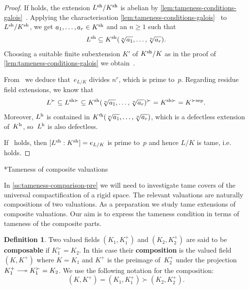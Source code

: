 \documentclass[a4paper,twoside,11pt,reqno]{amsart}
\makeatletter
\DeclareRobustCommand\longtwoheadrightarrow {\relbar\joinrel\twoheadrightarrow}
\newcommand{\surj}{\longtwoheadrightarrow}
\newcommand{\sep}{{\rm sep}} %
\newcommand{\sh}{{\rm sh}}   %
\newcommand{\rh}{{\rm h}}  %
\def\subsubsection{\@startsection{subsubsection}{3}%
      \z@{.5\linespacing\@plus.7\linespacing}{-.5em}%
      {\normalfont\bfseries}}
\theoremstyle{definition}
\newtheorem{defi}[thm]{Definition}
\numberwithin{equation}{subsection}
\makeatother
\begin{document}
\begin{proof}
    If  holds, the extension $L^\sh/K^\sh$ is abelian by \cref{lem:tameness-conditions-galois}~.
    Applying the characterisation 
    \cref{lem:tameness-conditions-galois}~ to $L^\sh/K^\sh$, we get $a_1,\ldots,a_r \in K^\sh$ and an 
    $n \ge 1$ such that
    \[
        L^\sh \subseteq K^\sh(\sqrt[n]{a_1}, \ldots, \sqrt[n]{a_r}).
    \]
    Choosing a suitable finite subextension $K'$ of $K^\sh/K$ as in the proof of \cref{lem:tameness-conditions-galois} we obtain~. 

    From~ we deduce that~$e_{L/K}$ divides $n^r$, which is prime to~$p$.
    Regarding residue field extensions, we know that
    \[
        L^\succ \subseteq L^{\sh\succ} \subseteq K^\sh(\sqrt[n]{a_1}, \ldots, \sqrt[n]{a_r})^\succ = K^{\sh\succ} = K^{\succ\sep}.
    \]
    Moreover, $L^\rh$ is contained in $K'^\rh(\sqrt[n]{a_1}, \ldots, \sqrt[n]{a_r})$, which is a defectless extension of~$K^\rh$, so~$L^\rh$ is also defectless.

    If~ holds, then $[L^\sh:K^\sh] = e_{L/K}$ is prime to~$p$ and hence $L/K$ is tame, i.e.\  holds.
\end{proof}


\subsubsection*{Tameness of composite valuations}

In \cref{ss:tameness-comparison-pre} we will need to investigate tame covers of the universal compactification of a rigid space.
The relevant valuations are naturally compositions of two valuations.
As a preparation we study tame extensions of composite valuations.
Our aim is to express the tameness condition in terms of tameness of the composite parts.


\begin{defi}
    Two valued fields $(K_1,K_1^+)$ and $(K_2,K_2^+)$ are said to be \textbf{composable} if $K_1^\succ = K_2$.
    In this case their \textbf{composition} is the valued field $(K,K^+)$ where $K = K_1$ and $K^+$ is the preimage of~$K_2^+$ under the projection $K_1^+ \surj K_1^\succ = K_2$.
    We use the following notation for the composition:
    \[
        (K,K^+) = (K_1,K_1^+) \succ (K_2,K_2^+).
    \]
\end{defi}
\end{document}

